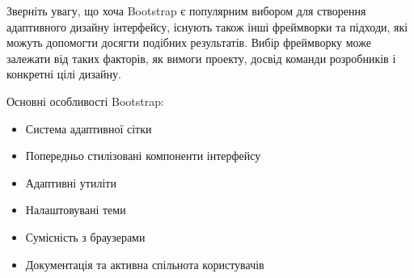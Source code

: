 Зверніть увагу, що хоча Bootstrap є популярним вибором для створення адаптивного дизайну інтерфейсу, існують також інші фреймворки та підходи, які можуть допомогти досягти подібних результатів. Вибір фреймворку може залежати від таких факторів, як вимоги проекту, досвід команди розробників і конкретні цілі дизайну.

Основні особливості Bootstrap:
\begin{itemize}
    \item Система адаптивної сітки
    \item Попередньо стилізовані компоненти інтерфейсу
    \item Адаптивні утиліти
    \item Налаштовувані теми
    \item Сумісність з браузерами
    \item Документація та активна спільнота користувачів
\end{itemize}
